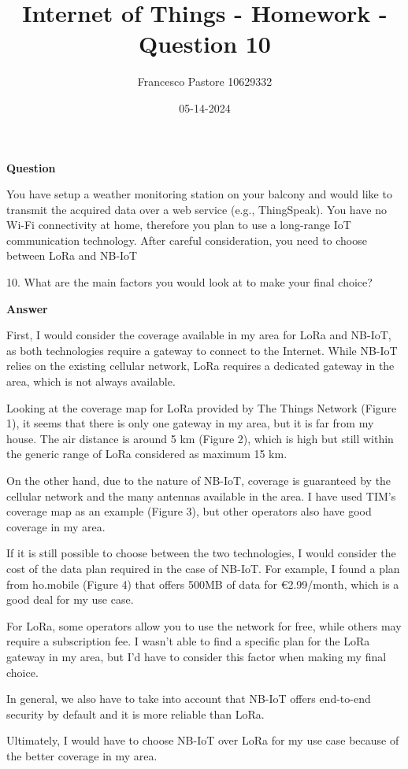 \documentclass[12pt]{article}
\title{Internet of Things - Homework - Question 10}
\author{Francesco Pastore 10629332}
\date{05-14-2024}
\begin{document}
\maketitle

\textbf{Question}

You have setup a weather monitoring station on your balcony and would like to transmit the acquired data over a web service (e.g., ThingSpeak).
You have no Wi-Fi connectivity at home, therefore you plan to use a long-range IoT communication technology.
After careful consideration, you need to choose between LoRa and NB-IoT

10. What are the main factors you would look at to make your final choice?

\textbf{Answer}

First, I would consider the coverage available in my area for LoRa and NB-IoT, as both technologies require a gateway to connect to the Internet.
While NB-IoT relies on the existing cellular network, LoRa requires a dedicated gateway in the area, which is not always available.

Looking at the coverage map for LoRa provided by The Things Network (Figure 1), it seems that there is only one gateway in my area, but it is far from my house.
The air distance is around 5 km (Figure 2), which is high but still within the generic range of LoRa considered as maximum 15 km.

On the other hand, due to the nature of NB-IoT, coverage is guaranteed by the cellular network and the many antennas available in the area.
I have used TIM's coverage map as an example (Figure 3), but other operators also have good coverage in my area.

If it is still possible to choose between the two technologies, I would consider the cost of the data plan required in the case of NB-IoT.
For example, I found a plan from ho.mobile (Figure 4) that offers 500MB of data for €2.99/month, which is a good deal for my use case.

For LoRa, some operators allow you to use the network for free, while others may require a subscription fee.
I wasn't able to find a specific plan for the LoRa gateway in my area, but I'd have to consider this factor when making my final choice.

In general, we also have to take into account that NB-IoT offers end-to-end security by default and it is more reliable than LoRa.

Ultimately, I would have to choose NB-IoT over LoRa for my use case because of the better coverage in my area.
\end{document}
